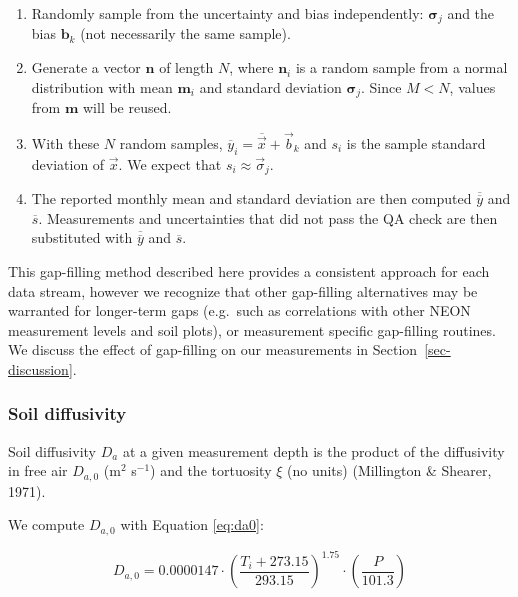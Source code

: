 \documentclass[
  letterpaper,
  DIV=11,
  numbers=noendperiod]{scrartcl}
\providecommand{\tightlist}{%
  \setlength{\itemsep}{0pt}\setlength{\parskip}{0pt}}\usepackage{longtable,booktabs,array}
\begin{document}
\begin{enumerate}
\def\labelenumi{\arabic{enumi}.}
\tightlist
\item
  Randomly sample from the uncertainty and bias independently:
  \(\boldsymbol\sigma_{j}\) and the bias \(\mathbf{b}_{k}\) (not
  necessarily the same sample).
\item
  Generate a vector \(\mathbf{n}\) of length \(N\), where
  \(\mathbf{n}_{i}\) is a random sample from a normal distribution with
  mean \(\boldsymbol{m}_{i}\) and standard deviation
  \(\boldsymbol\sigma_{j}\). Since \(M<N\), values from \(\mathbf{m}\)
  will be reused.
\item
  With these \(N\) random samples,
  \(\overline{y}_{i}=\overline{\vec{x}}+\vec{b}_{k}\) and \(s_{i}\) is
  the sample standard deviation of \(\vec{x}\). We expect that
  \(s_{i} \approx \vec{\sigma}_{j}\).
\item
  The reported monthly mean and standard deviation are then computed
  \(\overline{\overline{y}}\) and \(\overline{s}\). Measurements and
  uncertainties that did not pass the QA check are then substituted with
  \(\overline{\overline{y}}\) and \(\overline{s}\).
\end{enumerate}

This gap-filling method described here provides a consistent approach
for each data stream, however we recognize that other gap-filling
alternatives may be warranted for longer-term gaps (e.g.~such as
correlations with other NEON measurement levels and soil plots), or
measurement specific gap-filling routines. We discuss the effect of
gap-filling on our measurements in Section~\ref{sec-discussion}.

\subsubsection{Soil diffusivity}\label{sec-compute-diffusivity}

Soil diffusivity \(D_{a}\) at a given measurement depth is the product
of the diffusivity in free air \(D_{a,0}\) (m\(^{2}\) s\(^{-1}\)) and
the tortuosity \(\xi\) (no units) (Millington \& Shearer, 1971).

We compute \(D_{a,0}\) with Equation \ref{eq:da0}:

\begin{equation}
  D_{a,0} = 0.0000147 \cdot \left( \frac{T_{i} + 273.15}{293.15} \right)^{1.75} \cdot \left( \frac{P}{101.3} \right)
  \label{eq:da0}
\end{equation}
\end{document}
